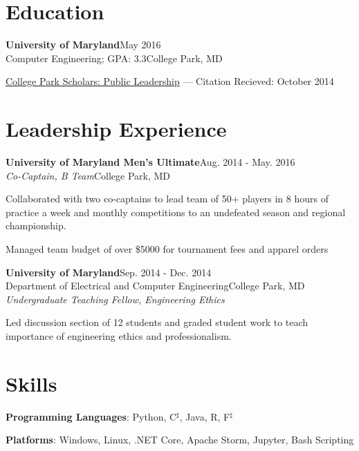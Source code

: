\documentclass[letterpaper,12pt]{article}
\def \myrespresectionskip {-.25in}
\def \resumeitemizeskip{0in}
\def \jobskip{.075in}
\newcommand{\resheading}[5]{
\large{\textbf{#1}}\hfill{\rmfamily\normalsize\textcolor{faded}{#2}} \\
\normalsize{#3}\hfill{\textcolor{faded}{\normalsize#4}}\\
\normalsize{#5}
\normalsize
}
\newcommand{\resitem}[1]{\item #1 \vspace{-2pt}}
\begin{document}
\section*{Education}
\resheading{{University of Maryland}}{May 2016}{Computer Engineering; GPA: 3.3}{College Park, MD}{}\footnotesize
 \begin{resumeitemize}
	\vspace{-.2in}
            \item{\href{http://www.scholars.umd.edu/programs/pl}{College Park Scholars: Public Leadership} --- Citation Recieved: October 2014}

          \end{resumeitemize}

\vspace{\myrespresectionskip}
\section*{Leadership Experience}
\resheading{{University of Maryland Men's Ultimate}}{Aug. 2014 \-- May. 2016}{\emph{Co-Captain, B Team}}{College Park, MD}{}
   { \footnotesize
\vspace{-.2in}
      \begin{resumeitemize}
	\item{Collaborated with two co-captains to lead team of 50+ players in 8 hours of practice a week and monthly competitions to an undefeated season and regional championship.}
	\item{Managed team budget of over \$5000 for tournament fees and apparel orders}
          \end{resumeitemize}
}
\vspace{\jobskip}
\resheading{{University of Maryland}}{Sep. 2014 \-- Dec. 2014}{{Department of Electrical and Computer Engineering}}{College Park, MD}{\emph{Undergraduate Teaching Fellow, Engineering Ethics}}
   { \footnotesize
\vspace{\resumeitemizeskip}
      \begin{resumeitemize}
	\item{Led discussion section of 12 students and graded student work to teach importance of engineering ethics and professionalism.}
          \end{resumeitemize}
}
\vspace{\myrespresectionskip}
\section*{Skills}
\begin{skillsitemize} 
\resitem{\textbf{Programming Languages}: Python, C$^\sharp$, Java, R, F$^\sharp$}
\resitem{\textbf{Platforms}: Windows, Linux, .NET Core, Apache Storm, Jupyter, Bash Scripting}
\end{skillsitemize}
\end{document}
